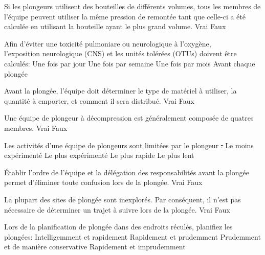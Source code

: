 \documentclass[english,10pt,a4paper,twoside]{article}
\begin{document}
\begin{outline}
		\1 Si les plongeurs utilisent des bouteilles de différents volumes, tous les membres de l'équipe peuvent utiliser la même pression de remontée tant que celle-ci a été calculée en utilisant la bouteille ayant le plus grand volume.
			\2 Vrai
			\2 Faux

		\1 Afin d'éviter une toxicité pulmoniare ou neurologique à l'oxygène,\\l'exposition neurologique (CNS) et les unités tolérées (OTUs) doivent être calculés:
			\2 Une fois par jour
			\2 Une fois par semaine
			\2 Une fois par mois
			\2 Avant chaque plongée

		\1 Avant la plongée, l'équipe doit déterminer le type de matériel à utiliser, la quantité à emporter, et comment il sera distribué.
			\2 Vrai
			\2 Faux

		\1 Une équipe de plongeur à décompression est généralement composée de quatres membres.
			\2 Vrai
			\2 Faux

		\1 Les activités d'une équipe de plongeurs sont limitées par le plongeur \st.
			\2 Le moins expérimenté
			\2 Le plus expérimenté
			\2 Le plus rapide
			\2 Le plus lent

		\1 Établir l'ordre de l'équipe et la délégation des responsabilités avant la plongée permet d'éliminer toute confusion lors de la plongée.
			\2 Vrai
			\2 Faux

		\1 La plupart des sites de plongée sont inexplorés. Par conséquent, il n'est pas nécessaire de déterminer un trajet à suivre lors de la plongée.
			\2 Vrai
			\2 Faux

		\1 Lors de la planification de plongée dans des endroits réculés, planifiez les plongées:
			\2 Intelligemment et rapidement
			\2 Rapidement et prudemment
			\2 Prudemment et de manière conservative
			\2 Rapidement et imprudemment
	\end{outline}
	\vfill
	\pagebreak

\end{document}
